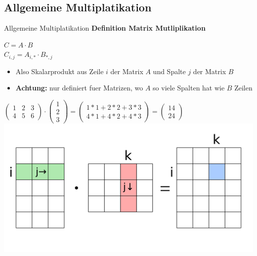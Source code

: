 \documentclass[10pt,aspectratio=169]{beamer}
\begin{document}
  \subsection{Allgemeine Multiplatikation}
  \begin{frame}{Allgemeine Multiplatikation}
    \textbf{Definition Matrix Mutliplikation}
    \begin{center}
      $C = A \cdot B$ \\
      $C_{i,j} = A_{i,*} \cdot B_{*,j}$\\
    \end{center}
    \begin{itemize}
      \item Also Skalarprodukt aus Zeile $i$ der Matrix $A$ und Spalte $j$ der Matrix $B$
      \item \textbf{Achtung:} nur definiert fuer Matrizen, wo $A$ so viele Spalten hat wie $B$ Zeilen
    \end{itemize}
    \begin{center}
      $\begin{pmatrix}
        1 & 2 & 3\\
        4 & 5 & 6
      \end{pmatrix}
      \cdot
      \begin{pmatrix}
        1\\2\\3
      \end{pmatrix}
      = \begin{pmatrix}
        1*1 + 2*2 + 3*3 \\
        4*1 + 4*2 + 4*3
      \end{pmatrix} =
      \begin{pmatrix}
        14\\24
      \end{pmatrix}$\\
      \includegraphics[scale=0.075]{matrix_mult}
    \end{center}
  \end{frame}
\end{document}
